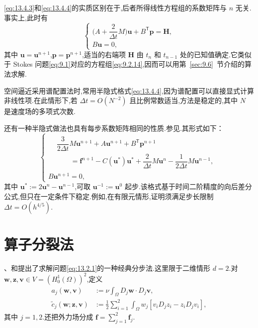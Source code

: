 \eqref{eq:13.4.3}和\eqref{eq:13.4.4}的实质区别在于,后者所得线性方程组的系数矩阵与 \(n\) 无关.事实上,此时有
\begin{equation}\label{eq:13.4.5}
  \begin{cases}
    \biggl(A+\dfrac2{\Delta t}M\biggr)\boldsymbol{u}+B^{\mathsf T}\boldsymbol{p}=\boldsymbol{H},\\[2pt]
    B\boldsymbol{u}=0,
  \end{cases}
\end{equation}
其中 \(\boldsymbol{u}=\boldsymbol{u}^{n+1}\),\(\boldsymbol{p}=\boldsymbol{p}^{n+1}\),适当的右端项 \(\boldsymbol{H}\) 由 \(t_n\) 和 \(t_{n-1}\) 处的已知值确定.它类似于 Stokes 问题\eqref{eq:9.1}对应的方程组\eqref{eq:9.2.14},因而可以用第~\ref{sec:9.6}~节介绍的算法求解.

空间逼近采用谱配置法时,常用半隐式格式\eqref{eq:13.4.4},因为谱配置可以直接显式计算非线性项.在此情形下,若 \(\Delta t=O(N^{-2})\) 且比例常数适当,方法是稳定的,其中 \(N\) 是速度场的多项式次数.

还有一种半隐式做法也具有每步系数矩阵相同的性质.参见.其形式如下：
\begin{equation}\label{eq:13.4.6}
  \begin{cases}
    \begin{aligned}
      &\dfrac3{2\Delta t}M\boldsymbol{u}^{n+1}+A\boldsymbol{u}^{n+1}+B^{\mathsf T}\boldsymbol{p}^{n+1}\\
      &\qquad=\boldsymbol{f}^{n+1}-C(\boldsymbol{u}^*)\boldsymbol{u}^*
            +\dfrac2{\Delta t}M\boldsymbol{u}^n-\dfrac1{2\Delta t}M\boldsymbol{u}^{n-1},
    \end{aligned}\\[2pt]
    B\boldsymbol{u}^{n+1}=0,
  \end{cases}
\end{equation}
其中 \(\boldsymbol{u}^*:=2\boldsymbol{u}^n-\boldsymbol{u}^{n-1}\),可取 \(\boldsymbol{u}^{-1}:=\boldsymbol{u}^0\) 起步.该格式基于时间二阶精度的向后差分公式,但只在一定条件下稳定.例如,在有限元情形,证明须满足步长限制 \(\Delta t=O(h^{4/5})\).

\section{算子分裂法}\label{sec:13.5}

、和提出了求解问题\eqref{eq:13.2.1}的一种经典分步法.这里限于二维情形 \(d=2\).对 \(\boldsymbol{w},\boldsymbol{z},\boldsymbol{v}\in V=(H_0^1(\Omega))^2\),定义
\[
  \begin{aligned}
    a_j(\boldsymbol{w},\boldsymbol{v})&:=\nu\int_\Omega D_j\boldsymbol{w}\cdot D_j\boldsymbol{v},\\
    \widetilde c_j(\boldsymbol{w};\boldsymbol{z},\boldsymbol{v})
      &:=\tfrac12\sum_{i=1}^2\int_\Omega w_j[v_iD_jz_i-z_iD_jv_i],
  \end{aligned}
\]
其中 \(j=1,2\).还把外力场分成 \(\boldsymbol{f}=\sum_{j=1}^2\boldsymbol{f}_j\).

